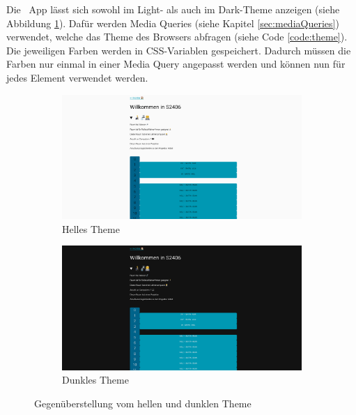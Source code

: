 
Die \ZELIA\ App lässt sich sowohl im Light- als auch im Dark-Theme anzeigen (siehe Abbildung \ref{fig:theme}). Dafür werden Media Queries (siehe Kapitel \ref{sec:mediaQueries}) verwendet, welche das Theme des Browsers abfragen (siehe Code \ref{code:theme}). 
Die jeweiligen Farben werden in CSS-Variablen gespeichert. Dadurch müssen die Farben nur einmal in einer Media Query angepasst werden und können nun für jedes Element verwendet werden. 

\begin{figure}[H]
    \begin{subfigure}[c]{0.5\textwidth}
        \centering
        \includegraphics[width=\textwidth]{media/ResponsiveDesign/ZeliaDesktop.png}
        \caption{Helles Theme}
    \end{subfigure} \hfill
    \begin{subfigure}[c]{0.5\textwidth}
        \centering
        \includegraphics[width=\textwidth]{media/ResponsiveDesign/ZeliaDesktopDark.png}
        \caption{Dunkles Theme}
    \end{subfigure}
    \caption{Gegenüberstellung vom hellen und dunklen Theme}
    \label{fig:theme}
\end{figure}

